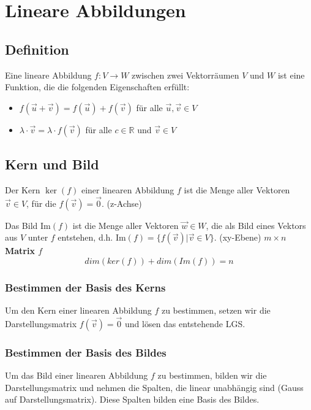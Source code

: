 \documentclass{article}
\begin{document}
\pagebreak

\section*{Lineare Abbildungen}
\begin{minipage}[t]{0.45\textwidth}
    \subsection*{Definition}
    Eine lineare Abbildung \( f: V \to W \) zwischen zwei Vektorräumen \( V \) und \( W \) ist eine Funktion, die die folgenden Eigenschaften erfüllt:
    \begin{itemize}
        \item \( f(\vec{u} + \vec{v}) = f(\vec{u}) + f(\vec{v}) \) für alle \( \vec{u}, \vec{v} \in V \)
        \item $\lambda \cdot \vec{v} = \lambda \cdot f(\vec{v})$ für alle \( c \in \mathbb{R} \) und \( \vec{v} \in V \)
    \end{itemize}

    \subsection*{Kern und Bild}
    Der Kern \( \ker(f) \) einer linearen Abbildung \( f \) ist die Menge aller Vektoren \( \vec{v} \in V \), für die \( f(\vec{v}) = \vec{0} \). (z-Achse)
    
    Das Bild \( \text{Im}(f) \) ist die Menge aller Vektoren \( \vec{w} \in W \), die als Bild eines Vektors aus \( V \) unter \( f \) entstehen, d.h. \( \text{Im}(f) = \{ f(\vec{v}) | \vec{v} \in V \} \). (xy-Ebene)
    \newline
    \newline
    \textbf{$m \times n$ Matrix $f$ }
    \begin{equation*}
        dim(ker(f)) + dim(Im(f)) = n
    \end{equation*}

    \subsubsection*{Bestimmen der Basis des Kerns}
    Um den Kern einer linearen Abbildung \( f \) zu bestimmen, setzen wir die Darstellungsmatrix \( f(\vec{v}) = \vec{0} \) und lösen das entstehende LGS.

    \subsubsection*{Bestimmen der Basis des Bildes}
    Um das Bild einer linearen Abbildung \( f \) zu bestimmen, bilden wir die Darstellungsmatrix und nehmen die Spalten, die linear unabhängig sind (Gauss auf Darstellungsmatrix). Diese Spalten bilden eine Basis des Bildes.


\end{minipage}
\end{document}
